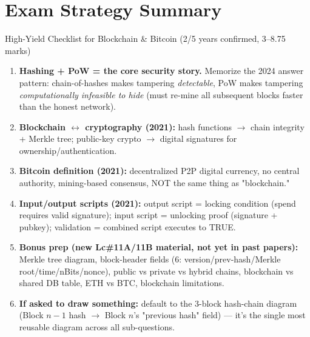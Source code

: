 \documentclass[12pt,a4paper]{article}
\begin{document}
\section*{Exam Strategy Summary}

\begin{keybox}{High-Yield Checklist for Blockchain \& Bitcoin (2/5 years confirmed, 3--8.75 marks)}
\begin{enumerate}[noitemsep]
  \item \textbf{Hashing + PoW = the core security story.} Memorize the 2024 answer pattern: chain-of-hashes makes tampering \emph{detectable}, PoW makes tampering \emph{computationally infeasible to hide} (must re-mine all subsequent blocks faster than the honest network).
  \item \textbf{Blockchain $\leftrightarrow$ cryptography (2021):} hash functions $\to$ chain integrity + Merkle tree; public-key crypto $\to$ digital signatures for ownership/authentication.
  \item \textbf{Bitcoin definition (2021):} decentralized P2P digital currency, no central authority, mining-based consensus, NOT the same thing as "blockchain."
  \item \textbf{Input/output scripts (2021):} output script = locking condition (spend requires valid signature); input script = unlocking proof (signature + pubkey); validation = combined script executes to TRUE.
  \item \textbf{Bonus prep (new Lc\#11A/11B material, not yet in past papers):} Merkle tree diagram, block-header fields (6: version/prev-hash/Merkle root/time/nBits/nonce), public vs private vs hybrid chains, blockchain vs shared DB table, ETH vs BTC, blockchain limitations.
  \item \textbf{If asked to draw something:} default to the 3-block hash-chain diagram (Block $n-1$ hash $\to$ Block $n$'s "previous hash" field) --- it's the single most reusable diagram across all sub-questions.
\end{enumerate}
\end{keybox}
\end{document}
